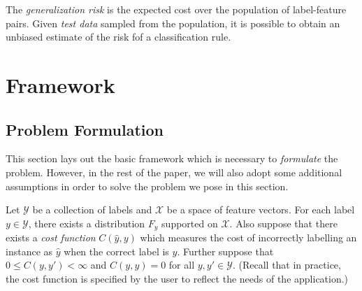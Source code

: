 \documentclass[12pt]{article}
\begin{document}
The \emph{generalization risk} is the expected cost over the
population of label-feature pairs.  Given \emph{test data} sampled
from the population, it is possible to obtain an unbiased estimate of
the risk fof a classification rule.






\section{Framework}\label{sec:formulation}

\subsection{Problem Formulation}

This section lays out the basic framework which is necessary to
\emph{formulate} the problem.  However, in the rest of the paper, we
will also adopt some additional assumptions in order to solve the
problem we pose in this section.

Let $\mathcal{Y}$ be a collection of labels and $\mathcal{X}$ be a
space of feature vectors.  For each label $y \in \mathcal{Y}$, there
exists a distribution $F_y$ supported on $\mathcal{X}$.  Also suppose
that there exists a \emph{cost function} $C(\hat{y}, y)$ which
measures the cost of incorrectly labelling an instance as $\hat{y}$
when the correct label is $y$.  Further suppose that $0 \leq C(y, y')
< \infty$ and $C(y, y)=0$ for all $y, y' \in \mathcal{Y}$.  (Recall
that in practice, the cost function is specified by the user to
reflect the needs of the application.)
\end{document}

